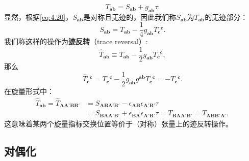 \begin{equation*}
	T_{\boldsymbol{ab}} =S_{\boldsymbol{ab}} +g_{\boldsymbol{ab}} \tau .
\end{equation*}
显然，根据\ref{eq:4.20}，$S_{\boldsymbol{ab}}$是对称且无迹的，因此我们称$S_{\boldsymbol{ab}}$为$T_{\boldsymbol{ab}}$的无迹部分：
\begin{equation*}
	S_{\boldsymbol{ab}} =T_{\boldsymbol{ab}} -\frac{1}{4} g_{\boldsymbol{ab}} T{_{\boldsymbol{c}}}^{\boldsymbol{c}} .
\end{equation*}
我们称这样的操作为\textbf{迹反转}（trace reversal）:
\begin{equation*}
	\hat{T}_{\boldsymbol{ab}} \equiv T_{\boldsymbol{ab}} -\frac{1}{2} g_{\boldsymbol{ab}} T{_{\boldsymbol{c}}}^{\boldsymbol{c}} ,
\end{equation*}
那么
\begin{equation*}
	\hat{T}{_{\boldsymbol{c}}}^{\boldsymbol{c}} =T{_{\boldsymbol{c}}}^{\boldsymbol{c}} -\frac{1}{2} g_{\boldsymbol{ab}} g^{\boldsymbol{ab}} T{_{\boldsymbol{c}}}^{\boldsymbol{c}} =-T{_{\boldsymbol{c}}}^{\boldsymbol{c}} .
\end{equation*}
在旋量形式中：
\begin{equation*}
	\begin{aligned}
		\hat{T}_{\boldsymbol{ab}} =\hat{T}_{\boldsymbol{AA} '\boldsymbol{BB} '} & =S_{\boldsymbol{ABA} '\boldsymbol{B} '} -\epsilon _{\boldsymbol{AB}} \epsilon _{\boldsymbol{A} '\boldsymbol{B} '} \tau \\
		& =S_{\boldsymbol{BAA} '\boldsymbol{B} '} +\epsilon _{\boldsymbol{BA}} \epsilon _{\boldsymbol{A} '\boldsymbol{B} '} \tau =T_{\boldsymbol{BAA} '\boldsymbol{B} '} =T_{\boldsymbol{ABB} '\boldsymbol{A} '} ,
	\end{aligned}
\end{equation*}
这意味着某两个旋量指标交换位置等价于（对称）张量上的迹反转操作。


\subsection{对偶化}

